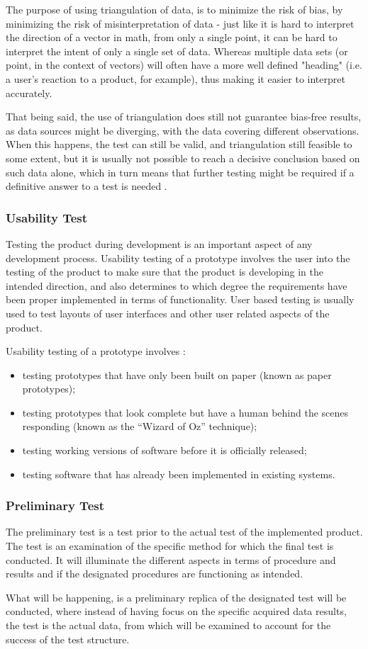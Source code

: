 The purpose of using triangulation of data, is to minimize the risk of bias, by minimizing the risk of misinterpretation of data - just like it is hard to interpret the direction of a vector in math, from only a single point, it can be hard to interpret the intent of only a single set of data. Whereas multiple data sets (or point, in the context of vectors) will often have a more well defined "heading" (i.e. a user's reaction to a product, for example), thus making it easier to interpret accurately.

That being said, the use of triangulation does still not guarantee bias-free results, as data sources might be diverging, with the data covering different observations. When this happens, the test can still be valid, and triangulation still feasible to some extent, but it is usually not possible to reach a decisive conclusion based on such data alone, which in turn means that further testing might be required if a definitive answer to a test is needed \parencite{Lazar2010}.


\subsubsection{Usability Test}
Testing the product during development is an important aspect of any development process. Usability testing of a prototype involves the user into the testing of the product to make sure that the product is developing in the intended direction, and also determines to which degree the requirements have been proper implemented in terms of functionality. User based testing is usually used to test layouts of user interfaces and other user related aspects of the product.

\noindent Usability testing of a prototype involves \parencite{Lazar2010}:
\begin{itemize}
\item testing prototypes that have only been built on paper (known as paper prototypes);
\item testing prototypes that look complete but have a human behind the scenes responding (known as the “Wizard of Oz” technique);
\item testing working versions of software before it is officially released;
\item testing software that has already been implemented in existing systems. 

\end{itemize}


\subsubsection{Preliminary Test}
The preliminary test is a test prior to the actual test of the implemented product. The test is an examination of the specific method for which the final test is conducted. It will illuminate the different aspects in terms of procedure and results and if the designated procedures are functioning as intended. 

What will be happening, is a preliminary replica of the designated test will be conducted, where instead of having focus on the specific acquired data results, the test is the actual data, from which will be examined to account for the success of the test structure.
